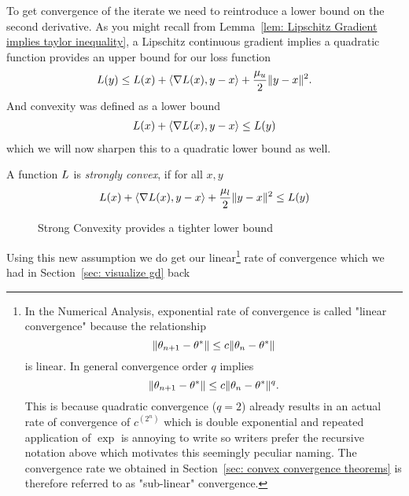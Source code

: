 To get convergence of the iterate we need to reintroduce a lower bound on
the second derivative. As you might recall from Lemma~\ref{lem: Lipschitz
Gradient implies taylor inequality}, a Lipschitz continuous gradient implies
a quadratic function provides an upper bound for our loss function
%
\begin{align}\label{eq: upper bound}
	L(y) \le L(x) + \langle \nabla L(x), y-x\rangle + \frac{\mu_u}{2}\|y-x\|^2.
\end{align}
%
And convexity was defined as a lower bound
%
\begin{align*}
	L(x) + \langle \nabla L(x), y-x\rangle \le L(y)
\end{align*}
%
which we will now sharpen this to a quadratic lower bound as well.
%
\begin{definition}
	A function \(L\) is \emph{strongly convex}, if for all \(x,y\)
	\begin{align*}
		L(x) + \langle \nabla L(x), y-x\rangle + \frac{\mu_l}{2}\|y-x\|^2 \le L(y)
	\end{align*}
\end{definition}
%
\begin{figure}[h]
	\centering
	\def\svgwidth{1\textwidth}
	
	\caption{Strong Convexity provides a tighter lower bound}
	\label{fig: visualize strong convexity}
\end{figure}
%
Using this new assumption we do get our linear\footnote{
	In the Numerical Analysis, exponential rate of
	convergence is called "linear convergence" because the relationship
	\[
		\|\theta_{n+1} - \theta^*\| \le c \|\theta_n - \theta^*\|
	\]
	is linear. In
	general convergence order \(q\) implies 
	\[
		\|\theta_{n+1} -\theta^*\| \le c\|\theta_n - \theta^*\|^q.
	\]
	This is because quadratic convergence (\(q=2\)) already results in an actual
	rate of convergence of \(c^{\left(2^n\right)}\) which is double exponential and
	repeated application of \(\exp\) is annoying to write so writers prefer the
	recursive notation above which motivates this seemingly peculiar naming.
	The convergence rate we obtained in Section~\ref{sec: convex convergence theorems}
	is therefore referred to as "sub-linear" convergence.
}
rate of convergence which we had in Section~\ref{sec: visualize gd} back
%
